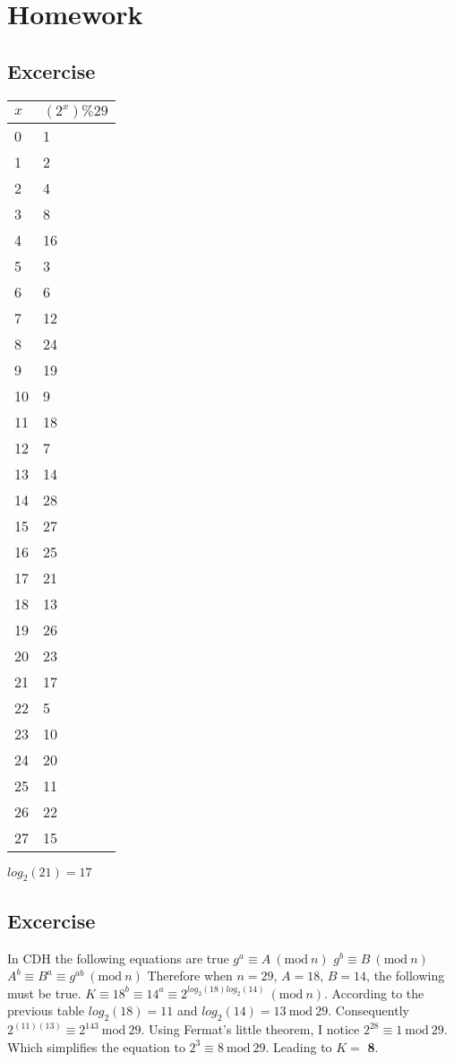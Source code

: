 \documentclass{article}
\begin{document}
\setcounter{section}{4}
\section{Homework}
\subsection{Excercise}
\begin{center}
\begin{tabular}{|ll|}
\hline
	$x$ & $(2^{x})\%29$  \\
\hline
	0 & 1 \\
	1 & 2 \\
	2 & 4 \\
	3 & 8 \\
	4 & 16 \\
	5 & 3 \\
	6 & 6 \\
	7 & 12 \\
	8 & 24 \\
	9 & 19 \\
	10 & 9 \\
	11 & 18 \\
	12 & 7 \\
	13 & 14 \\
	14 & 28 \\
	15 & 27 \\
	16 & 25 \\
	17 & 21 \\
	18 & 13 \\
	19 & 26 \\
	20 & 23 \\
	21 & 17 \\
	22 & 5 \\
	23 & 10 \\
	24 & 20 \\
	25 & 11 \\
	26 & 22 \\
	27 & 15 \\
\hline
\end{tabular}
\end{center}
$log_{2}(21) = 17$
\subsection{Excercise}
In CDH the following equations are true
\newline
$g^a \equiv A\ (\textrm{mod}\ n)$
\newline
$g^b \equiv B\ (\textrm{mod}\ n)$
\newline
$A^b \equiv B^a \equiv g^{ab}\ (\textrm{mod}\ n)$
\newline
Therefore when $n = 29$, $A = 18$, $B = 14$, the following must be true. $K \equiv 18^b \equiv 14^a \equiv 2^{log_2(18)log_2(14)}\ (\textrm{mod}\ n)$. According to the previous table $log_2(18) = 11$ and $log_2(14) = 13\ \textrm{mod}\ 29$. Consequently $2^{(11)(13)} \equiv 2^{143}\ \textrm{mod}\ 29$. Using Fermat's little theorem, I notice $2^{28} \equiv 1\ \textrm{mod}\ 29$. Which simplifies the equation to $2^{3} \equiv 8\ \textrm{mod}\ 29$. Leading to $K =$ \textbf{8}.
\end{document}
